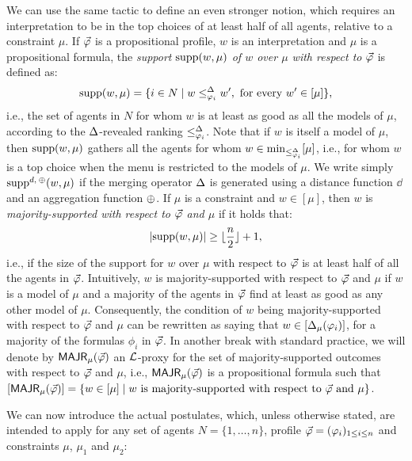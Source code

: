 We can use the same tactic to define an even stronger notion, 
which requires an interpretation to be 
in the top choices of at least half of all 
agents, relative to a constraint $\mu$.
If $\P$ is a propositional profile,
$w$ is an interpretation
and
$\mu$ is a propositional formula,
the \emph{support $\supp(w,\mu)$ of $w$ over $\mu$ with respect to $\P$}
is defined as:
	$$
		\supp(w,\mu)=\{i\in N\mid w\le^\me_{\phi_i} w',~\text{for every}~w'\in[\mu]\},
	$$
i.e., the set of agents in $N$ for whom $w$ is at least as good as all the models of $\mu$,
according to the $\me$-revealed ranking $\le^{\me}_{\phi_{i}}$.
Note that if $w$ is itself a model of $\mu$, then $\supp(w,\mu)$ gathers all the agents 
for whom $w\in\min_{\le^{\me}_{\phi_{i}}}[\mu]$,
i.e., for whom $w$ is a top choice when the menu is restricted to the models of $\mu$.
We write simply $\supp^{\dd,\:\agg}(w,\mu)$
if the merging operator $\me$ is generated using a distance function $\dd$ and 
an aggregation function $\agg$.
If $\mu$ is a constraint
and $w\in[\mu]$,
then $w$ is \emph{majority-supported with respect to $\P$ and $\mu$} if
it holds that:
$$
	|\supp(w,\mu)|\geq \lfloor\frac{n}{2}\rfloor+1,
$$
i.e., if the size of the support for $w$ over $\mu$ with respect to $\P$ is at least
half of all the agents in $\P$.
Intuitively, $w$ is majority-supported with respect to $\P$ and $\mu$ if $w$ is a model of $\mu$
and a majority of the agents in $\P$ find at least as good as any other
model of $\mu$.
Consequently, the condition of $w$ being majority-supported with respect to $\P$ and $\mu$
can be rewritten as saying that $w\in[\me_\mu(\phi_i)]$, for a majority of the formulas $\phi_i$ in $\P$.
In another break with standard practice, 
we will denote by $\MAJR_\mu(\P)$ an $\L$-proxy for 
the set of majority-supported outcomes with respect to $\P$ and $\mu$, i.e., 
$\MAJR_\mu(\P)$ is a propositional formula such that
$[\MAJR_\mu(\P)]=\{w\in[\mu]\mid w~\text{is majority-supported with respect to}~\P~\text{and}~\mu\}$.

We can now introduce the actual postulates,
which, unless otherwise stated,
are intended to apply for any 
set of agents $N=\{1,\dots,n\}$,
profile $\P=(\phi_i)_{1\le i \le n}$
and constraints $\mu$, $\mu_1$ and $\mu_2$:

